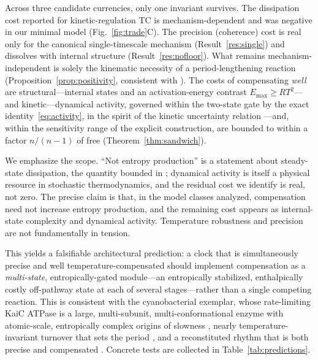 \documentclass[11pt,onecolumn]{article}
\theoremstyle{definition}
\newcommand{\Emax}{E_{\max}}
\begin{document}
Across three candidate currencies, only one invariant survives. The dissipation cost reported for kinetic-regulation TC \cite{Fu2024} is mechanism-dependent and was negative in our minimal model (Fig.~\ref{fig:trade}C). The precision (coherence) cost is real only for the canonical single-timescale mechanism (Result~\ref{res:single}) and dissolves with internal structure (Result~\ref{res:nofloor}). What remains mechanism-independent is solely the kinematic necessity of a period-lengthening reaction (Proposition~\ref{prop:positivity}, consistent with \cite{Ruoff1992,Fu2024}). The costs of compensating \emph{well} are structural---internal states and an activation-energy contrast $\Emax\ge RT^2$---and kinetic---dynamical activity, governed within the two-state gate by the exact identity~\eqref{eq:activity}, in the spirit of the kinetic uncertainty relation \cite{DiTerlizzi2019,Hiura2021}---and, within the sensitivity range of the explicit construction, are bounded to within a factor $n/(n-1)$ of free (Theorem~\ref{thm:sandwich}).

We emphasize the scope. ``Not entropy production'' is a statement about steady-state dissipation, the quantity bounded in \cite{Fu2024,BaratoSeifert2016}; dynamical activity is itself a physical resource in stochastic thermodynamics, and the residual cost we identify is real, not zero. The precise claim is that, in the model classes analyzed, compensation need not increase entropy production, and the remaining cost appears as internal-state complexity and dynamical activity. Temperature robustness and precision are not fundamentally in tension.

This yields a falsifiable architectural prediction: a clock that is simultaneously precise and well temperature-compensated should implement compensation as a \emph{multi-state}, entropically-gated module---an entropically stabilized, enthalpically costly off-pathway state at each of several stages---rather than a single competing reaction. This is consistent with the cyanobacterial exemplar, whose rate-limiting KaiC ATPase is a large, multi-subunit, multi-conformational enzyme with atomic-scale, entropically complex origins of slowness \cite{Abe2015}, nearly temperature-invariant turnover that sets the period \cite{Terauchi2007}, and a reconstituted rhythm that is both precise and compensated \cite{Nakajima2005}. Concrete tests are collected in Table~\ref{tab:predictions}.
\end{document}
